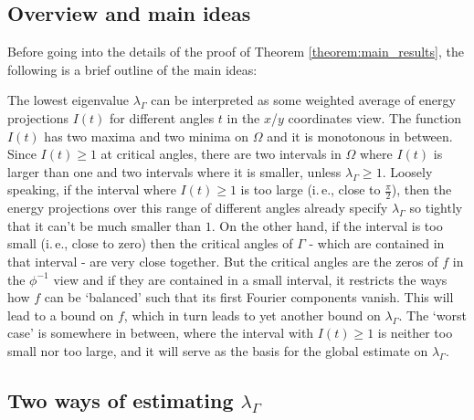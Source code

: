 \documentclass{article}
\newcommand{\ite}{i.\,e.\xspace}
\begin{document}
\subsection{Overview and main ideas}
Before going into the details of the proof of Theorem \ref{theorem:main_results}, the following is a brief outline of the main ideas: 

The lowest eigenvalue $\lambda_\Gamma$ can be interpreted as some weighted average of energy projections $I(t)$ for different angles $t$ in the $x$/$y$ coordinates view. The function $I(t)$ has two maxima and two minima on $\Omega$ and it is monotonous in between. Since $I(t) \ge 1$ at critical angles, there are two intervals in $\Omega$ where $I(t)$ is larger than one and two intervals where it is smaller, unless $\lambda_\Gamma \ge 1$. Loosely speaking, if the interval where $I(t) \ge 1$ is too large (\ite, close to $\frac{\pi}{2}$), then the energy projections over this range of different angles already specify $\lambda_\Gamma$ so tightly that it can't be much smaller than $1$. On the other hand, if the interval is too small (\ite, close to zero) then the critical angles of $\Gamma$ - which are contained in that interval - are very close together. But the critical angles are the zeros of $f$ in the $\phi^{-1}$ view and if they are contained in a small interval, it restricts the ways how $f$ can be `balanced' such that its first Fourier components vanish. This will lead to a bound on $f$, which in turn leads to yet another bound on $\lambda_\Gamma$. The `worst case' is somewhere in between, where the interval with $I(t) \ge 1$ is neither too small nor too large, and it will serve as the basis for the global estimate on $\lambda_\Gamma$.

\subsection{Two ways of estimating $\lambda_\Gamma$} \label{subsec:two_ways}
\end{document}
